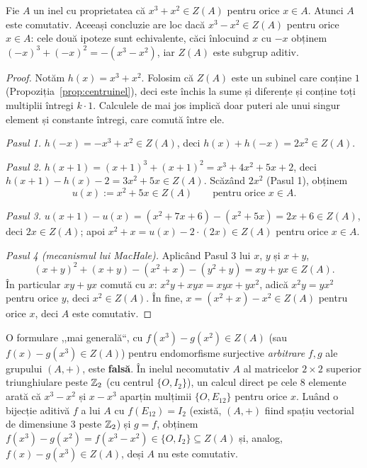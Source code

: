 \begin{propozitie}\label{prop:machalegen}
Fie $A$ un inel cu proprietatea că $x^3+x^2\in Z(A)$ pentru orice $x\in A$. Atunci $A$ este comutativ. Aceeași concluzie are loc dacă $x^3-x^2\in Z(A)$ pentru orice $x\in A$: cele două ipoteze sunt echivalente, căci înlocuind $x$ cu $-x$ obținem $(-x)^3+(-x)^2=-(x^3-x^2)$, iar $Z(A)$ este subgrup aditiv.
\end{propozitie}
\begin{proof}
Notăm $h(x)=x^3+x^2$. Folosim că $Z(A)$ este un subinel care conține $1$ (Propoziția~\ref{prop:centruinel}), deci este închis la sume și diferențe și conține toți multiplii întregi $k\cdot1$. Calculele de mai jos implică doar puteri ale unui singur element și constante întregi, care comută între ele.

\emph{Pasul 1.} $h(-x)=-x^3+x^2\in Z(A)$, deci $h(x)+h(-x)=2x^2\in Z(A)$.

\emph{Pasul 2.} $h(x+1)=(x+1)^3+(x+1)^2=x^3+4x^2+5x+2$, deci $h(x+1)-h(x)-2=3x^2+5x\in Z(A)$. Scăzând $2x^2$ (Pasul 1), obținem
\[
u(x):=x^2+5x\in Z(A)\qquad\text{pentru orice }x\in A.
\]

\emph{Pasul 3.} $u(x+1)-u(x)=(x^2+7x+6)-(x^2+5x)=2x+6\in Z(A)$, deci $2x\in Z(A)$; apoi $x^2+x=u(x)-2\cdot(2x)\in Z(A)$ pentru orice $x\in A$.

\emph{Pasul 4 (mecanismul lui MacHale).} Aplicând Pasul 3 lui $x$, $y$ și $x+y$,
\[
(x+y)^2+(x+y)-(x^2+x)-(y^2+y)=xy+yx\in Z(A).
\]
În particular $xy+yx$ comută cu $x$: $x^2y+xyx=xyx+yx^2$, adică $x^2y=yx^2$ pentru orice $y$, deci $x^2\in Z(A)$. În fine, $x=(x^2+x)-x^2\in Z(A)$ pentru orice $x$, deci $A$ este comutativ.
\end{proof}

\begin{observatie}
O formulare ,,mai generală``, cu $f(x^3)-g(x^2)\in Z(A)$ (sau $f(x)-g(x^3)\in Z(A)$) pentru endomorfisme surjective \emph{arbitrare} $f,g$ ale grupului $(A,+)$, este \textbf{falsă}. În inelul necomutativ $A$ al matricelor $2\times2$ superior triunghiulare peste $\mathbb{Z}_2$ (cu centrul $\{O,I_2\}$), un calcul direct pe cele $8$ elemente arată că $x^3-x^2$ și $x-x^3$ aparțin mulțimii $\{O,E_{12}\}$ pentru orice $x$. Luând o bijecție aditivă $f$ a lui $A$ cu $f(E_{12})=I_2$ (există, $(A,+)$ fiind spațiu vectorial de dimensiune $3$ peste $\mathbb{Z}_2$) și $g=f$, obținem $f(x^3)-g(x^2)=f(x^3-x^2)\in\{O,I_2\}\subseteq Z(A)$ și, analog, $f(x)-g(x^3)\in Z(A)$, deși $A$ nu este comutativ.
\end{observatie}

